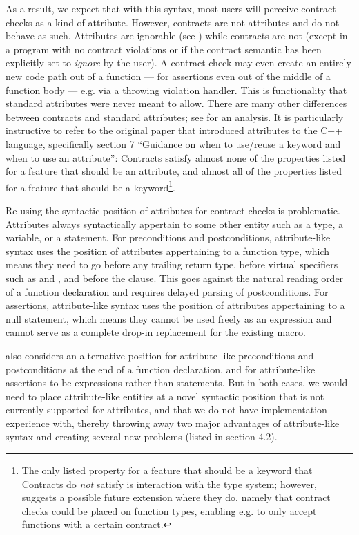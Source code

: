 As a result, we expect that with this syntax, most users will perceive contract checks as a kind of attribute. However, contracts are not attributes and do not behave as such. Attributes are ignorable (see \cite{P2552R3}) while contracts are not (except in a program with no contract violations or if the contract semantic has been explicitly set to \emph{ignore} by the user). A contract check may even create an entirely new code path out of a function --- for assertions even out of the middle of a function body --- e.g. via a throwing violation handler. This is functionality that standard attributes were never meant to allow. There are many other differences between contracts and standard attributes; see \cite{P2487R1} for an analysis. It is particularly instructive to refer to the original paper \cite{N2761} that introduced attributes to the C++ language, specifically section 7 ``Guidance on when to use/reuse a keyword and when to use an attribute'': Contracts satisfy almost none of the properties listed for a feature that should be an attribute, and almost all of the properties listed for a feature that should be a keyword\footnote{The only listed property for a feature that should be a keyword that Contracts do \emph{not} satisfy is interaction with the type system; however, \cite{P2935R3} suggests a possible future extension where they do, namely that contract checks could be placed on function types, enabling e.g.  to only accept functions with a certain contract.}.

Re-using the syntactic position of attributes for contract checks is problematic. Attributes always syntactically appertain to some other entity such as a type, a variable, or a statement. For preconditions and postconditions, attribute-like syntax uses the position of attributes appertaining to a function type, which means they need to go before any trailing return type, before virtual specifiers such as  and , and before the  clause. This goes against the natural reading order of a function declaration and requires delayed parsing of postconditions. For assertions, attribute-like syntax uses the position of attributes appertaining to a null statement, which means they cannot be used freely as an expression and cannot serve as a complete drop-in replacement for the existing  macro.

\cite{P2935R3} also considers an alternative position for attribute-like preconditions and postconditions at the end of a function declaration, and for attribute-like assertions to be expressions rather than statements. But in both cases, we would need to place attribute-like entities at a novel syntactic position that is not currently supported for attributes, and that we do not have implementation experience with, thereby throwing away two major advantages of attribute-like syntax and creating several new problems (listed in \cite{P2935R3} section 4.2).

